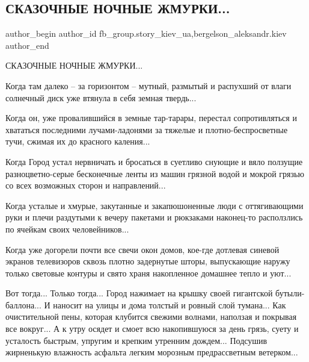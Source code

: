  
 
 
 
 
 
\subsection{СКАЗОЧНЫЕ НОЧНЫЕ ЖМУРКИ...}
\label{sec:12_12_2021.fb.fb_group.story_kiev_ua.3.zhmurki}
 
\ifcmt
 author_begin
   author_id fb_group.story_kiev_ua,bergelson_aleksandr.kiev
 author_end
\fi

СКАЗОЧНЫЕ НОЧНЫЕ ЖМУРКИ...

Когда там далеко – за горизонтом – мутный, размытый и распухший от влаги
солнечный диск уже втянула в себя земная твердь...

Когда он, уже провалившийся в земные тар-тарары, перестал сопротивляться и
хвататься последними лучами-ладонями за тяжелые и плотно-беспросветные тучи,
сжимая их до красного каления...


Когда Город устал нервничать и бросаться в суетливо снующие и вяло ползущие
разноцветно-серые бесконечные ленты из машин грязной водой и мокрой грязью
со всех возможных сторон и направлений...

Когда усталые и хмурые, закутанные и закапюшоненные люди с оттягивающими
руки и плечи раздутыми к вечеру пакетами и рюкзаками наконец-то расползлись
по ячейкам своих человейников...

Когда уже догорели почти все свечи окон домов, кое-где дотлевая синевой
экранов телевизоров сквозь плотно задернутые шторы, выпускающие наружу
только световые контуры и свято храня накопленное домашнее тепло и уют...


Вот тогда... Только тогда... Город нажимает на крышку своей гигантской
бутыли-баллона... И наносит на улицы и дома толстый и ровный слой тумана... Как
очистительной пены, которая клубится свежими волнами, наползая и покрывая
все вокруг... А к утру осядет и смоет всю накопившуюся за день грязь, суету и
усталость быстрым, упругим и крепким утренним дождем... Подсушив жирненькую
влажность асфальта легким морозным предрассветным ветерком...

